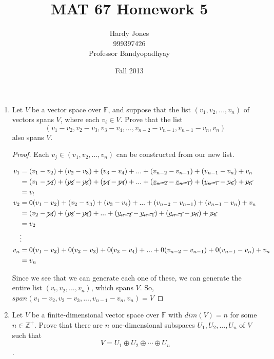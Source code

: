 \documentclass[12pt,letterpaper]{article}
\title{MAT 67 Homework 5\vspace{-2ex}}
\author{Hardy Jones\\
        999397426\\
        Professor Bandyopadhyay\vspace{-2ex}}
\date{Fall 2013}
\begin{document}
  \maketitle

  \begin{enumerate}
    \item
      Let $V$ be a vector space over $\mathbb{F}$,
      and suppose that the list $(v_1, v_2, ..., v_n)$ of vectors spans $V$,
      where each $v_i \in V$.
      Prove that the list 
      \[(v_1 - v_2, v_2 - v_3, v_3 - v_4, ..., v_{n-2} - v_{n-1}, v_{n-1} - v_n, v_n)\]
      also spans $V$.

      \begin{proof}
        Each $v_j \in (v_1, v_2, ..., v_n)$ can be constructed from our new list.

        \begin{align*}
          v_1 &= (v_1 - v_2) + (v_2 - v_3) + (v_3 - v_4) + ... + (v_{n-2} - v_{n-1}) + (v_{n-1} - v_n) + v_n \\
          &= (v_1 - \cancel{v_2}) + (\cancel{v_2} - \cancel{v_3}) + (\cancel{v_3} - \cancel{v_4}) + ... + (\cancel{v_{n-2}} - \cancel{v_{n-1}}) + (\cancel{v_{n-1}} - \cancel{v_n}) + \cancel{v_n} \\
          &= v_! \\
          v_2 &= 0(v_1 - v_2) + (v_2 - v_3) + (v_3 - v_4) + ... + (v_{n-2} - v_{n-1}) + (v_{n-1} - v_n) + v_n \\
          &= (v_2 - \cancel{v_3}) + (\cancel{v_3} - \cancel{v_4}) + ... + (\cancel{v_{n-2}} - \cancel{v_{n-1}}) + (\cancel{v_{n-1}} - \cancel{v_n}) + \cancel{v_n} \\
          &= v_2 \\
          &\vdots \\
          v_n &= 0(v_1 - v_2) + 0(v_2 - v_3) + 0(v_3 - v_4) + ... + 0(v_{n-2} - v_{n-1}) + 0(v_{n-1} - v_n) + v_n \\
          &= v_n
        \end{align*}

        Since we see that we can generate each one of these,
        we can generate the entire list $(v_!, v_2, ..., v_n)$, which spans $V$.
        So, $span(v_1 - v_2, v_2 - v_3, ..., v_{n-1}- v_n, v_n) = V$
      \end{proof}

    \pagebreak

    \item
      Let $V$ be a finite-dimensional vector space over $\mathbb{F}$
      with $dim(V) = n$ for some $n \in \mathbb{Z}^+$.
      Prove that there are $n$ one-dimensional subspaces $U_1, U_2, ..., U_n$ of $V$ such that
      \[V = U_1 \oplus U_2 \oplus \cdots \oplus U_n\].


\end{enumerate}
\end{document}
